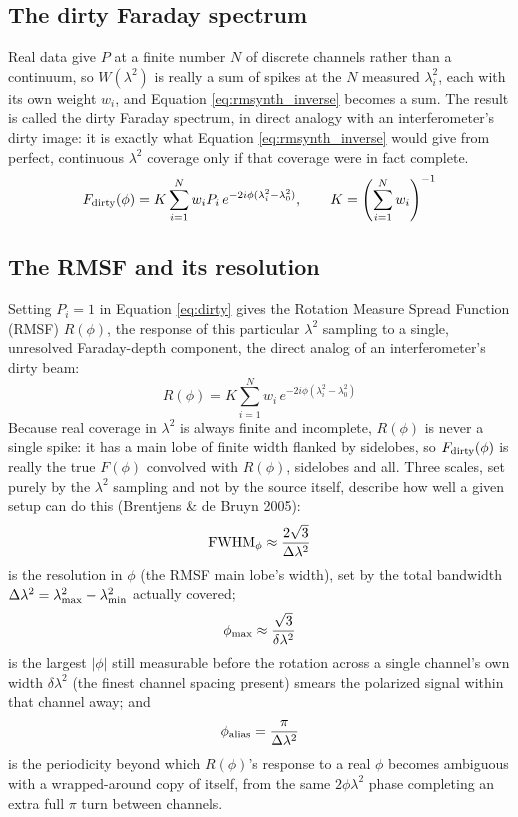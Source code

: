 \subsection{The dirty Faraday spectrum}
Real data give $P$ at a finite number $N$ of discrete channels rather than a continuum, so $W(\lambda^2)$ is really a sum of spikes at the $N$ measured $\lambda_i^2$, each with its own weight $w_i$, and Equation \ref{eq:rmsynth_inverse} becomes a sum. The result is called the dirty Faraday spectrum, in direct analogy with an interferometer's dirty image: it is exactly what Equation \ref{eq:rmsynth_inverse} would give from perfect, continuous $\lambda^2$ coverage only if that coverage were in fact complete.
\begin{equation}\label{eq:dirty}
    \displaystyle F_{\rm dirty}(\phi) = K\sum_{i=1}^{N} w_i P_i\,e^{-2i\phi(\lambda_i^2-\lambda_0^2)}, \qquad K=\left(\sum_{i=1}^N w_i\right)^{-1}
\end{equation}

\subsection{The RMSF and its resolution}
Setting $P_i=1$ in Equation \ref{eq:dirty} gives the Rotation Measure Spread Function (RMSF) $R(\phi)$, the response of this particular $\lambda^2$ sampling to a single, unresolved Faraday-depth component, the direct analog of an interferometer's dirty beam:
\begin{equation}\label{eq:rmsf}
    \displaystyle R(\phi) = K\sum_{i=1}^N w_i\,e^{-2i\phi(\lambda_i^2-\lambda_0^2)}
\end{equation}
Because real coverage in $\lambda^2$ is always finite and incomplete, $R(\phi)$ is never a single spike: it has a main lobe of finite width flanked by sidelobes, so $F_{\rm dirty}(\phi)$ is really the true $F(\phi)$ convolved with $R(\phi)$, sidelobes and all. Three scales, set purely by the $\lambda^2$ sampling and not by the source itself, describe how well a given setup can do this (Brentjens \& de Bruyn 2005):
\begin{equation}\label{eq:fwhm}
    \displaystyle {\rm FWHM}_\phi \approx \frac{2\sqrt{3}}{\Delta\lambda^2}
\end{equation}
is the resolution in $\phi$ (the RMSF main lobe's width), set by the total bandwidth $\Delta\lambda^2=\lambda^2_{\rm max}-\lambda^2_{\rm min}$ actually covered;
\begin{equation}\label{eq:phimax}
    \displaystyle \phi_{\rm max} \approx \frac{\sqrt{3}}{\delta\lambda^2}
\end{equation}
is the largest $|\phi|$ still measurable before the rotation across a single channel's own width $\delta\lambda^2$ (the finest channel spacing present) smears the polarized signal within that channel away; and
\begin{equation}\label{eq:phialias}
    \displaystyle \phi_{\rm alias} = \frac{\pi}{\Delta\lambda^2}
\end{equation}
is the periodicity beyond which $R(\phi)$'s response to a real $\phi$ becomes ambiguous with a wrapped-around copy of itself, from the same $2\phi\lambda^2$ phase completing an extra full $\pi$ turn between channels.
\\

